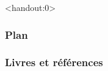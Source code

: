 \begin{frame}<handout:0>
  \frametitle{Plan}
  \tableofcontents[currentsection,subsectionstyle=hide]
\end{frame}

\nocite{*}


\begin{frame}[allowframebreaks]
  \frametitle{Livres et références}
  
\end{frame}

\begin{frame}
  \vfill
  \centering
  \vfill
\end{frame}
